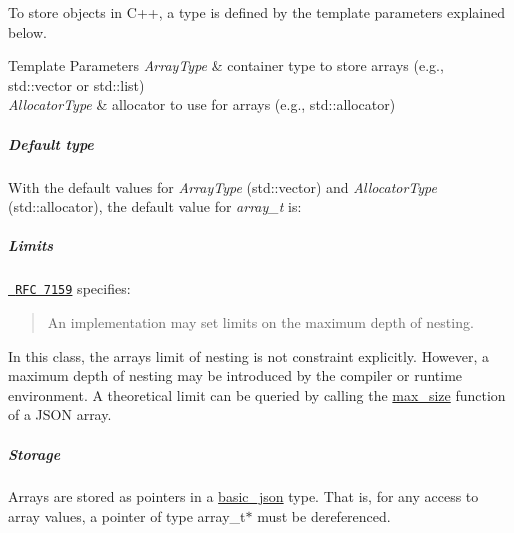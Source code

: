 To store objects in C++, a type is defined by the template parameters explained below.


\begin{DoxyTemplParams}{Template Parameters}
{\em Array\+Type} & container type to store arrays (e.\+g., {\ttfamily std\+::vector} or {\ttfamily std\+::list}) \\
\hline
{\em Allocator\+Type} & allocator to use for arrays (e.\+g., {\ttfamily std\+::allocator})\\
\hline
\end{DoxyTemplParams}
\subparagraph*{Default type}

With the default values for {\itshape Array\+Type} ({\ttfamily std\+::vector}) and {\itshape Allocator\+Type} ({\ttfamily std\+::allocator}), the default value for {\itshape array\+\_\+t} is\+:


\begin{DoxyCode}{0}
\DoxyCodeLine{>}
\end{DoxyCode}


\subparagraph*{Limits}

\href{http://rfc7159.net/rfc7159}{\texttt{ R\+FC 7159}} specifies\+: \begin{quote}
An implementation may set limits on the maximum depth of nesting. \end{quote}


In this class, the array\textquotesingle{}s limit of nesting is not constraint explicitly. However, a maximum depth of nesting may be introduced by the compiler or runtime environment. A theoretical limit can be queried by calling the \mbox{\hyperlink{classnlohmann_1_1basic__json_a2f47d3c6a441c57dd2be00449fbb88e1}{max\+\_\+size}} function of a J\+S\+ON array.

\subparagraph*{Storage}

Arrays are stored as pointers in a \mbox{\hyperlink{classnlohmann_1_1basic__json}{basic\+\_\+json}} type. That is, for any access to array values, a pointer of type {\ttfamily array\+\_\+t$\ast$} must be dereferenced.

